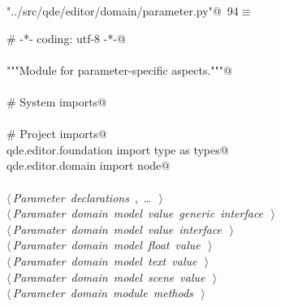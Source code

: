 \documentclass[
    a4paper,      %
    10pt,         %
    openright,    %
    notitlepage,  %
    parskip=half, %
]{scrreprt}       %
\theoremstyle{definition}                    %
\begin{document}
\begin{flushleft} \small
\begin{minipage}{\linewidth}\label{scrap151}\raggedright\small
{} \verb@"../src/qde/editor/domain/parameter.py"@\nobreak\ {\footnotesize {94}}$\equiv$
\vspace{-1ex}
\begin{list}{}{} \item
\mbox{}\lstinline@# -*- coding: utf-8 -*-@\\
\mbox{}\lstinline@@\\
\mbox{}\lstinline@"""Module for parameter-specific aspects."""@\\
\mbox{}\lstinline@@\\
\mbox{}\lstinline@# System imports@\\
\mbox{}\lstinline@@\\
\mbox{}\lstinline@# Project imports@\\
\mbox{}\lstinline@from qde.editor.foundation import type as types@\\
\mbox{}\lstinline@from qde.editor.domain import node@\\
\mbox{}\lstinline@@\\
\mbox{}\lstinline@@\hbox{$\langle\,${\itshape Parameter declarations}\nobreak\ {\footnotesize {}, \ldots\ }$\,\rangle$}\lstinline@@\\
\mbox{}\lstinline@@\hbox{$\langle\,${\itshape Paramater domain model value generic interface}\nobreak\ {\footnotesize {}}$\,\rangle$}\lstinline@@\\
\mbox{}\lstinline@@\hbox{$\langle\,${\itshape Paramater domain model value interface}\nobreak\ {\footnotesize {}}$\,\rangle$}\lstinline@@\\
\mbox{}\lstinline@@\hbox{$\langle\,${\itshape Paramater domain model float value}\nobreak\ {\footnotesize {}}$\,\rangle$}\lstinline@@\\
\mbox{}\lstinline@@\hbox{$\langle\,${\itshape Paramater domain model text value}\nobreak\ {\footnotesize {}}$\,\rangle$}\lstinline@@\\
\mbox{}\lstinline@@\hbox{$\langle\,${\itshape Paramater domain model scene value}\nobreak\ {\footnotesize {}}$\,\rangle$}\lstinline@@\\
\mbox{}\lstinline@@\hbox{$\langle\,${\itshape Parameter domain module methods}\nobreak\ {\footnotesize {}}$\,\rangle$}\lstinline@@\\
\mbox{}\lstinline@@{\NWsep}
\end{list}
\vspace{-1.5ex}
\footnotesize
\begin{list}{}{\setlength{\itemsep}{-\parsep}\setlength{\itemindent}{-\leftmargin}}

\item{}
\end{list}
\end{minipage}\vspace{4ex}
\end{flushleft}
\end{document}
